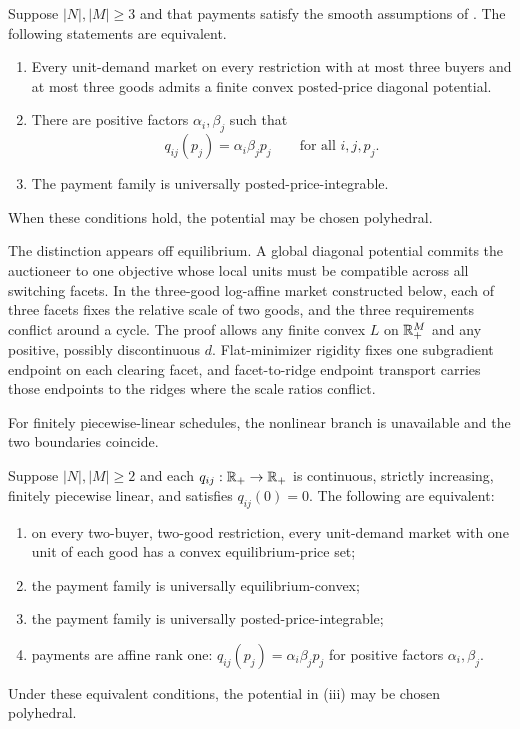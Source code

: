 \begin{theorem}\label{thm:potential}
Suppose $|N|,|M|\ge3$ and that payments satisfy the smooth assumptions of . The following statements are equivalent.
\begin{enumerate}[label=(\roman*),leftmargin=2.2em]
\item Every unit-demand market on every restriction with at most three buyers and at most three goods admits a finite convex posted-price diagonal potential.
\item There are positive factors $\alpha_i,\beta_j$ such that
\[
q_{ij}(p_j)=\alpha_i\beta_jp_j
\qquad\text{for all }i,j,p_j.
\]
\item The payment family is universally posted-price-integrable.
\end{enumerate}
When these conditions hold, the potential may be chosen polyhedral.
\end{theorem}

The distinction appears off equilibrium. A global diagonal potential commits the auctioneer to one objective whose local units must be compatible across all switching facets. In the three-good log-affine market constructed below, each of three facets fixes the relative scale of two goods, and the three requirements conflict around a cycle. The proof allows any finite convex $L$ on $\mathbb{R}_+^M$ and any positive, possibly discontinuous $d$. Flat-minimizer rigidity fixes one subgradient endpoint on each clearing facet, and facet-to-ridge endpoint transport carries those endpoints to the ridges where the scale ratios conflict.

For finitely piecewise-linear schedules, the nonlinear branch is unavailable and the two boundaries coincide.

\begin{corollary}\label{cor:piecewise}
Suppose $|N|,|M|\ge2$ and each $q_{ij}:\mathbb{R}_+\to\mathbb{R}_+$ is continuous, strictly increasing, finitely piecewise linear, and satisfies $q_{ij}(0)=0$. The following are equivalent:
\begin{enumerate}[label=(\roman*),leftmargin=2.2em]
\item on every two-buyer, two-good restriction, every unit-demand market with one unit of each good has a convex equilibrium-price set;
\item the payment family is universally equilibrium-convex;
\item the payment family is universally posted-price-integrable;
\item payments are affine rank one: $q_{ij}(p_j)=\alpha_i\beta_jp_j$ for positive factors $\alpha_i,\beta_j$.
\end{enumerate}
Under these equivalent conditions, the potential in (iii) may be chosen polyhedral.
\end{corollary}

